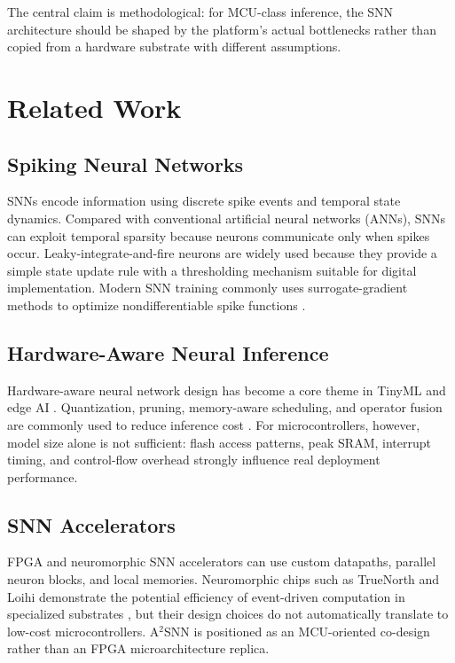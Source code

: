 \documentclass[journal]{IEEEtran}
\newcommand{\modelname}{A$^2$SNN}
\begin{document}
The central claim is methodological: for MCU-class inference, the SNN architecture should be shaped by the platform's actual bottlenecks rather than copied from a hardware substrate with different assumptions.

\section{Related Work}
\subsection{Spiking Neural Networks}
SNNs encode information using discrete spike events and temporal state dynamics. Compared with conventional artificial neural networks (ANNs), SNNs can exploit temporal sparsity because neurons communicate only when spikes occur. Leaky-integrate-and-fire neurons are widely used because they provide a simple state update rule with a thresholding mechanism suitable for digital implementation. Modern SNN training commonly uses surrogate-gradient methods to optimize nondifferentiable spike functions \cite{neftci2019surrogate,zenke2018superspike}.

\subsection{Hardware-Aware Neural Inference}
Hardware-aware neural network design has become a core theme in TinyML and edge AI \cite{banbury2021benchmarking}. Quantization, pruning, memory-aware scheduling, and operator fusion are commonly used to reduce inference cost \cite{jacob2018quantization,han2016eie}. For microcontrollers, however, model size alone is not sufficient: flash access patterns, peak SRAM, interrupt timing, and control-flow overhead strongly influence real deployment performance.

\subsection{SNN Accelerators}
FPGA and neuromorphic SNN accelerators can use custom datapaths, parallel neuron blocks, and local memories. Neuromorphic chips such as TrueNorth and Loihi demonstrate the potential efficiency of event-driven computation in specialized substrates \cite{merolla2014truenorth,davies2018loihi}, but their design choices do not automatically translate to low-cost microcontrollers. \modelname{} is positioned as an MCU-oriented co-design rather than an FPGA microarchitecture replica.
\end{document}
